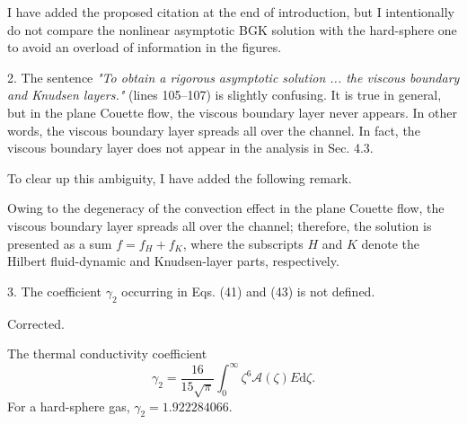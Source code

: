 \documentclass{article}
\newcommand{\dd}{\mathrm{d}}
\begin{document}
I have added the proposed citation at the end of introduction,
but I intentionally do not compare the nonlinear asymptotic BGK solution with the hard-sphere one
to avoid an overload of information in the figures.

\begin{quoting}
2. The sentence \emph{"To obtain a rigorous asymptotic solution ... the viscous boundary and Knudsen layers."}
(lines 105--107) is slightly confusing.
It is true in general, but in the plane Couette flow, the viscous boundary layer never appears.
In other words, the viscous boundary layer spreads all over the channel.
In fact, the viscous boundary layer does not appear in the analysis in Sec. 4.3.
\end{quoting}

To clear up this ambiguity, I have added the following remark.

\begin{leftbar}
Owing to the degeneracy of the convection effect in the plane Couette flow,
the viscous boundary layer spreads all over the channel;
therefore, the solution is presented as a sum \(f = f_H + f_K\),
where the subscripts \(H\) and \(K\) denote the Hilbert fluid-dynamic and Knudsen-layer parts, respectively.
\end{leftbar}

\begin{quoting}
3. The coefficient \(\gamma_2\) occurring in Eqs. (41) and (43) is not defined.
\end{quoting}

Corrected.

\begin{leftbar}
The thermal conductivity coefficient
\begin{equation}\label{eq:gamma_2}
    \gamma_2 = \frac{16}{15\sqrt{\pi}}\int_0^\infty \zeta^6 \mathcal{A}(\zeta)E\dd\zeta.
\end{equation}
For a hard-sphere gas, \(\gamma_2 = 1.922284066\).
\end{leftbar}
\end{document}
